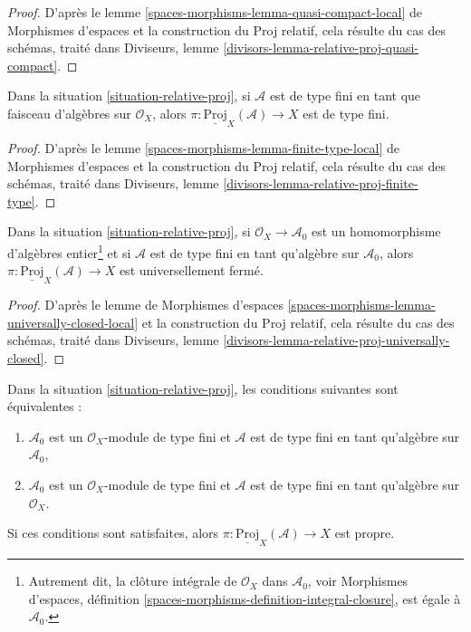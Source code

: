 \begin{proof}
D'après le lemme \ref{spaces-morphisms-lemma-quasi-compact-local} de Morphismes d'espaces
et la construction du Proj relatif, cela résulte du
cas des schémas, traité dans
Diviseurs, lemme \ref{divisors-lemma-relative-proj-quasi-compact}.
\end{proof}

\begin{lemma}
\label{lemma-relative-proj-finite-type}
Dans la situation \ref{situation-relative-proj},
si $\mathcal{A}$ est de type fini en tant que faisceau
d'algèbres sur $\mathcal{O}_X$, alors
$\pi : \underline{\text{Proj}}_X(\mathcal{A}) \to X$ est de type fini.
\end{lemma}

\begin{proof}
D'après le lemme \ref{spaces-morphisms-lemma-finite-type-local} de Morphismes d'espaces
et la construction du Proj relatif, cela résulte du
cas des schémas, traité dans
Diviseurs, lemme \ref{divisors-lemma-relative-proj-finite-type}.
\end{proof}

\begin{lemma}
\label{lemma-relative-proj-universally-closed}
Dans la situation \ref{situation-relative-proj}, si
$\mathcal{O}_X \to \mathcal{A}_0$
est un homomorphisme d'algèbres entier\footnote{Autrement dit, la clôture intégrale
de $\mathcal{O}_X$ dans $\mathcal{A}_0$, voir
Morphismes d'espaces, définition
\ref{spaces-morphisms-definition-integral-closure}, est égale à
$\mathcal{A}_0$.} et si $\mathcal{A}$ est de type fini en tant
qu'algèbre sur $\mathcal{A}_0$, alors
$\pi : \underline{\text{Proj}}_X(\mathcal{A}) \to X$ est universellement fermé.
\end{lemma}

\begin{proof}
D'après le lemme de Morphismes d'espaces
\ref{spaces-morphisms-lemma-universally-closed-local}
et la construction du Proj relatif, cela résulte du
cas des schémas, traité dans
Diviseurs, lemme \ref{divisors-lemma-relative-proj-universally-closed}.
\end{proof}

\begin{lemma}
\label{lemma-relative-proj-proper}
Dans la situation \ref{situation-relative-proj},
les conditions suivantes sont équivalentes :
\begin{enumerate}
\item $\mathcal{A}_0$ est un $\mathcal{O}_X$-module de type fini
et $\mathcal{A}$ est de type fini en tant qu'algèbre sur $\mathcal{A}_0$,
\item $\mathcal{A}_0$ est un $\mathcal{O}_X$-module de type fini
et $\mathcal{A}$ est de type fini en tant qu'algèbre sur $\mathcal{O}_X$.
\end{enumerate}
Si ces conditions sont satisfaites, alors
$\pi : \underline{\text{Proj}}_X(\mathcal{A}) \to X$
est propre.
\end{lemma}

